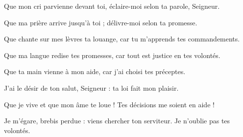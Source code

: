 \item Que mon cri parvienne devant toi, éclaire-moi selon ta parole, Seigneur.

\item Que ma prière arrive jusqu'à toi ; délivre-moi selon ta promesse.

\item Que chante sur mes lèvres ta louange, car tu m'apprends tes commandements.

\item Que ma langue redise tes promesses, car tout est justice en tes volontés.

\item Que ta main vienne à mon aide, car j'ai choisi tes préceptes.

\item J'ai le désir de ton salut, Seigneur : ta loi fait mon plaisir.

\item Que je vive et que mon âme te loue ! Tes décisions me soient en aide !

\item Je m'égare, brebis perdue : viens chercher ton serviteur. Je n'oublie pas tes volontés.
